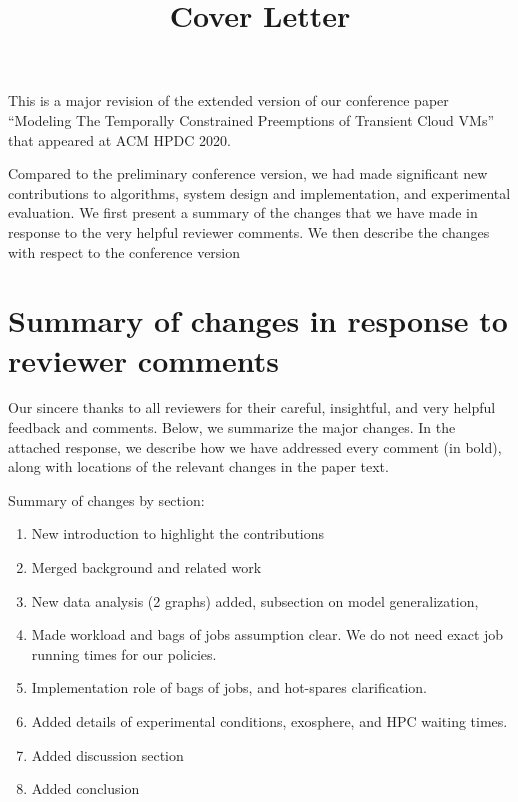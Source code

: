 \documentclass{article}
\title{Cover Letter}
\date{}
\begin{document}
\maketitle

This is a major revision of the extended version of our conference paper ``Modeling The Temporally Constrained Preemptions of Transient Cloud VMs'' that appeared at ACM HPDC 2020. 

Compared to the preliminary conference version, we had made significant new contributions to algorithms, system design and implementation, and experimental evaluation.
We first present a summary of the changes that we have made in response to the very helpful reviewer comments. We then describe the changes with respect to the conference version 


\section{Summary of changes in response to reviewer comments}
Our sincere thanks to all reviewers for their careful, insightful, and very helpful feedback and comments. Below, we summarize the major changes. In the attached response, we describe how we have addressed every comment (in bold), along with locations of the relevant changes in the paper text.


Summary of changes by section:
\begin{enumerate}
\item New introduction to highlight the contributions 
\item Merged background and related work 
\item New data analysis (2 graphs) added, subsection on model generalization,
\item Made workload and bags of jobs assumption clear. We do not need exact  job running times for our policies. 
\item Implementation role of bags of jobs, and hot-spares clarification.  
\item Added details of experimental conditions, exosphere, and HPC waiting times.  
\item Added discussion section
\item Added conclusion
\end{enumerate}



\end{document}
